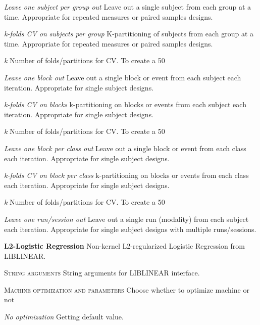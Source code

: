 \textit{Leave one subject per group out}
Leave out a single subject from each group at a time. Appropriate for repeated measures or paired samples designs.


\textit{k-folds CV on subjects per group}
K-partitioning of subjects from each group at a time. Appropriate for repeated measures or paired samples designs.


\textit{k}
Number of folds/partitions for CV. To create a 50%


\textit{Leave one block out}
Leave out a single block or event from each subject each iteration. Appropriate for single subject designs.


\textit{k-folds CV on blocks}
k-partitioning on blocks or events from each subject each iteration. Appropriate for single subject designs.


\textit{k}
Number of folds/partitions for CV. To create a 50%


\textit{Leave one block per class out}
Leave out a single block or event from each class each iteration. Appropriate for single subject designs.


\textit{k-folds CV on block per class}
k-partitioning on blocks or events from each class each iteration. Appropriate for single subject designs.


\textit{k}
Number of folds/partitions for CV. To create a 50%


\textit{Leave one run/session out}
Leave out a single run (modality) from each subject each iteration. Appropriate for single subject designs with multiple runs/sessions.


\textbf{L2-Logistic Regression}
Non-kernel L2-regularized Logistic Regression from LIBLINEAR.


\textsc{String arguments}
String arguments for LIBLINEAR interface.


\textsc{Machine optimization and parameters}
Choose whether to optimize machine or not


\textsl{No optimization}
Getting default value.



